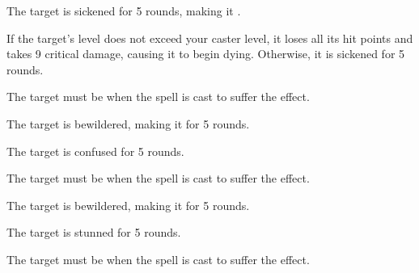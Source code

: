 \spellrng{\rngclose}
\begin{spellhealthy}
  The target is sickened for 5 rounds, making it \vulnerable.
\end{spellhealthy}
\begin{spellblood}
  If the target's level does not exceed your caster level, it loses all its hit points and takes 9 critical damage, causing it to begin dying. Otherwise, it is sickened for 5 rounds.
\end{spellblood}
\begin{spellnotes}
  The target must be \bloodied when the spell is cast to suffer the \bloodied effect.
\end{spellnotes}

\spellrng{\rngclose}
\begin{spellhealthy}
  The target is bewildered, making it \vulnerable for 5 rounds.
\end{spellhealthy}
\begin{spellblood}
  The target is confused for 5 rounds. \confusionexplanation
\end{spellblood}
\begin{spellnotes}
  The target must be \bloodied when the spell is cast to suffer the \bloodied effect.
\end{spellnotes}

\spellrng{\rngclose}
\begin{spellhealthy}
  The target is bewildered, making it \vulnerable for 5 rounds.
\end{spellhealthy}
\begin{spellblood}
  The target is stunned for 5 rounds.
\end{spellblood}
\begin{spellnotes}
  The target must be \bloodied when the spell is cast to suffer the \bloodied effect.
\end{spellnotes}

